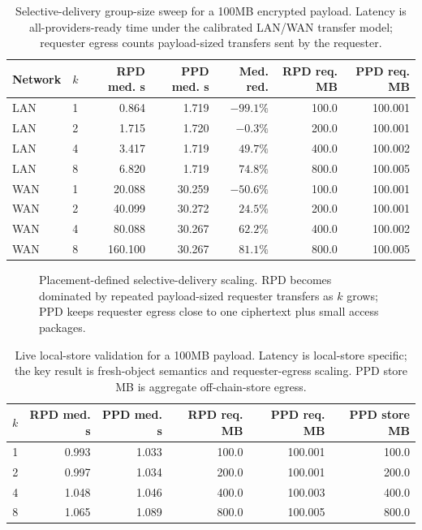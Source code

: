\documentclass[sigplan,screen,review,anonymous]{acmart}
\newcommand{\suppDeliveryScalingWidth}{1\linewidth}
\begin{document}
\begin{table}[t]
\centering
\scriptsize
\setlength{\tabcolsep}{4.2pt}
\caption{Selective-delivery group-size sweep for a 100MB encrypted payload.
Latency is all-providers-ready time under the calibrated LAN/WAN transfer
model; requester egress counts payload-sized transfers sent by the requester.}
\label{tab:app-delivery-sweep-exact}
\begin{tabular}{llrrrrr}
\toprule
Network & \(k\) & RPD med. s & PPD med. s & Med. red. & RPD req. MB & PPD req. MB \\
\midrule
LAN & 1 & 0.864 & 1.719 & \(-99.1\%\) & 100.0 & 100.001 \\
LAN & 2 & 1.715 & 1.720 & \(-0.3\%\) & 200.0 & 100.001 \\
LAN & 4 & 3.417 & 1.719 & \(49.7\%\) & 400.0 & 100.002 \\
LAN & 8 & 6.820 & 1.719 & \(74.8\%\) & 800.0 & 100.005 \\
\midrule
WAN & 1 & 20.088 & 30.259 & \(-50.6\%\) & 100.0 & 100.001 \\
WAN & 2 & 40.099 & 30.272 & \(24.5\%\) & 200.0 & 100.001 \\
WAN & 4 & 80.088 & 30.267 & \(62.2\%\) & 400.0 & 100.002 \\
WAN & 8 & 160.100 & 30.267 & \(81.1\%\) & 800.0 & 100.005 \\
\bottomrule
\end{tabular}
\end{table}

\begin{figure}[t]
\centering
\resizebox{\suppDeliveryScalingWidth}{!}{}
\caption{Placement-defined selective-delivery scaling. RPD becomes dominated
by repeated payload-sized requester transfers as \(k\) grows; PPD keeps
requester egress close to one ciphertext plus small access packages.}
\label{fig:app-delivery-scaling}
\end{figure}

\begin{table}[t]
\centering
\scriptsize
\setlength{\tabcolsep}{4pt}
\caption{Live local-store validation for a 100MB payload. Latency is
local-store specific; the key result is fresh-object semantics and
requester-egress scaling. PPD store MB is aggregate off-chain-store egress.}
\label{tab:app-live-store}
\begin{tabular}{rrrrrr}
\toprule
\(k\) & RPD med. s & PPD med. s & RPD req. MB & PPD req. MB & PPD store MB \\
\midrule
1 & 0.993 & 1.033 & 100.0 & 100.001 & 100.0 \\
2 & 0.997 & 1.034 & 200.0 & 100.001 & 200.0 \\
4 & 1.048 & 1.046 & 400.0 & 100.003 & 400.0 \\
8 & 1.065 & 1.089 & 800.0 & 100.005 & 800.0 \\
\bottomrule
\end{tabular}
\end{table}
\end{document}

